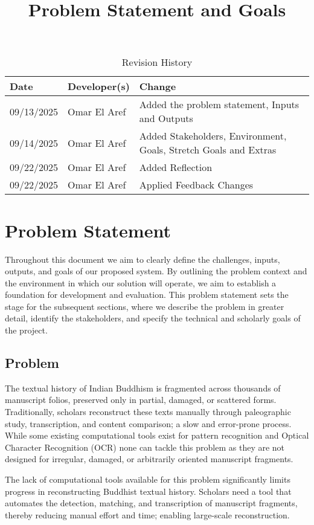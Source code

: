 \documentclass{article}
\title{Problem Statement and Goals\\\progname}
\author{\authname}
\date{}
\begin{document}
\maketitle

\begin{table}[hp]
\caption{Revision History} \label{TblRevisionHistory}
\begin{tabularx}{\textwidth}{llX}
\toprule
\textbf{Date} & \textbf{Developer(s)} & \textbf{Change}\\
\midrule
09/13/2025 & Omar El Aref & Added the problem statement, Inputs and Outputs\\
09/14/2025 & Omar El Aref & Added Stakeholders, Environment, Goals, Stretch Goals and Extras\\
09/22/2025 & Omar El Aref & Added Reflection\\
09/22/2025 & Omar El Aref & Applied Feedback Changes\\
\bottomrule
\end{tabularx}
\end{table}

\section{Problem Statement}
Throughout this document we aim to clearly define the challenges, inputs, outputs, and goals of our proposed system. By outlining the problem context and the environment in which our solution will operate, we aim to establish a foundation for development and evaluation. This problem statement sets the stage for the subsequent sections, where we describe the problem in greater detail, identify the stakeholders, and specify the technical and scholarly goals of the project.

\subsection{Problem}
The textual history of Indian Buddhism is fragmented across thousands of manuscript folios, preserved only in partial, damaged, or scattered forms. Traditionally, scholars reconstruct these texts manually through paleographic study, transcription, and content comparison; a slow and error-prone process. While some existing computational tools exist for pattern recognition and Optical Character Recognition (OCR) none can tackle this problem as they are not designed for irregular, damaged, or arbitrarily oriented manuscript fragments. 

The lack of computational tools available for this problem significantly limits progress in reconstructing Buddhist textual history. Scholars need a tool that automates the detection, matching, and transcription of manuscript fragments, thereby reducing manual effort and time; enabling large-scale reconstruction.
\end{document}
